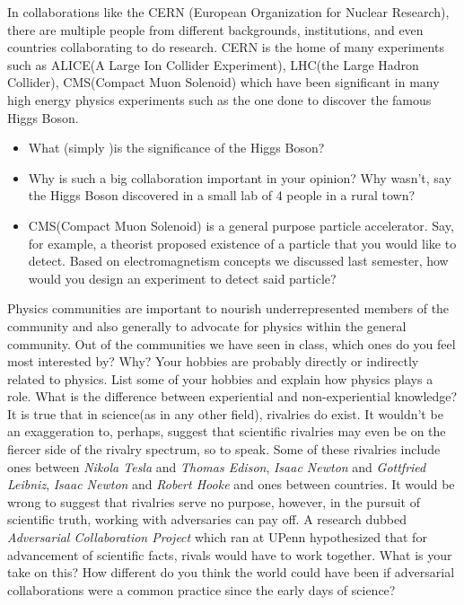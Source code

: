\documentclass[12pt,addpoints]{exam}
\begin{document}
\begin{questions}
		\question In collaborations like the CERN (European Organization for Nuclear Research), there are multiple people from different backgrounds, institutions, and even countries collaborating to do research. CERN is the home of many experiments such as ALICE(A Large Ion Collider Experiment), LHC(the Large Hadron Collider), CMS(Compact Muon Solenoid) which have been significant in many high energy physics experiments such as the one done to discover the famous Higgs Boson.
		\begin{itemize}
			\item What (simply )is the significance of the Higgs Boson? \vspace{0.5in}
			\item Why is such a big collaboration important in your opinion? Why wasn't, say the Higgs Boson discovered in a small lab of 4 people in a rural town? \\ \vspace{1in}
			\item CMS(Compact Muon Solenoid) is a general purpose particle accelerator. Say, for example, a theorist proposed existence of a particle that you would like to detect. Based on electromagnetism concepts we discussed last semester, how would you design an experiment to detect said particle?\vspace{2in}
		\end{itemize}
		\question Physics communities are important to nourish underrepresented members of the community and also generally to advocate for physics within the general community. Out of the communities we have seen in class, which ones do you feel most interested by? Why? \vspace{1in}
		\question Your hobbies are probably directly or indirectly related to physics. List some of your hobbies and explain how physics plays a role. \vspace{1in}
		\question What is the difference between experiential and non-experiential knowledge?\vspace{1in}
		\question It is true that in science(as in any other field), rivalries do exist. It wouldn't be an exaggeration to, perhaps, suggest that scientific rivalries may even be on the fiercer side of the rivalry spectrum, so to speak. Some of these rivalries include ones between \textit{Nikola Tesla} and \textit{Thomas Edison}, \textit{Isaac Newton} and \textit{Gottfried Leibniz}, \textit{Isaac Newton} and \textit{Robert Hooke} and ones between countries. It would be wrong to suggest that rivalries serve no purpose, however, in the pursuit of scientific truth, working with adversaries can pay off. A research  dubbed \textit{Adversarial Collaboration Project} which ran at UPenn hypothesized that for advancement of scientific facts, rivals would have to work together. What is your take on this? How different do you think the world could have been if adversarial collaborations were a common practice since the early days of science?\vspace{1in}
		\begin{center}

\end{center}
\end{questions}
\end{document}
